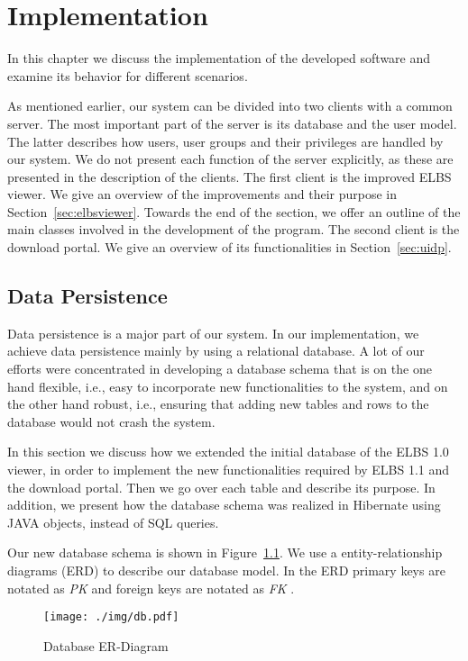 \chapter{Implementation}
\label{chap:impl}

In this chapter we discuss the implementation of the developed software and examine
its behavior for different scenarios.
 
As mentioned earlier, our system can be divided into two clients with a common server. 
The most important part of the server is its database and the user model. The latter describes how users, user groups and their privileges are handled by our system. We do not present each function of the server explicitly, as these are presented in the description of the clients. 
The first client is the improved ELBS viewer. We give an overview of the improvements and their purpose in Section~\ref{sec:elbsviewer}.
Towards the end of the section, we offer an  outline of the main classes involved in the development of the program.
The second client is the download portal. We give an overview of its functionalities in Section~\ref{sec:uidp}. 

\section{Data Persistence}
\label{sec:datapersistance}
Data persistence is a major part of our system. 
In our implementation, we achieve data persistence mainly by using a relational database.
A lot of our efforts were concentrated in developing a database schema that is on the one hand flexible, 
i.e., easy to incorporate new functionalities to the system, and on the other hand robust, i.e., 
ensuring that adding new tables and rows to the database would not crash the system.  

In this section we discuss how we extended the initial database of the ELBS 1.0 viewer, in order
to implement the new functionalities required by ELBS 1.1 and the download portal. Then we go
over each table and describe its purpose. In addition, we present how the database schema was 
realized in Hibernate using JAVA objects, instead of SQL queries.

Our new database schema is shown in Figure~\ref{fig:db}. 
We use a entity-relationship diagrams (ERD) to describe our database model. 
In the ERD primary keys are notated as \emph{PK} and 
foreign keys are notated as \emph{FK} .  

\begin{figure}[htp]
	\begin{center}
		\texttt{[image: ./img/db.pdf]}
		\caption{Database ER-Diagram}
		\label{fig:db}
	\end{center}
\end{figure}

